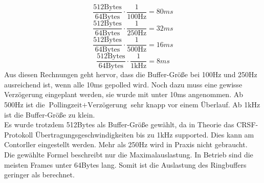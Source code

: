 \[
    \frac{512 \text{Bytes}}{64 \text{Bytes}} \cdot \frac{1}{100 \text{Hz}} = 80ms
\] 
\[
    \frac{512 \text{Bytes}}{64 \text{Bytes}} \cdot \frac{1}{250 \text{Hz}} = 32ms
\] 
\[
    \frac{512 \text{Bytes}}{64 \text{Bytes}} \cdot \frac{1}{500 \text{Hz}} = 16ms
\] 
\[
    \frac{512 \text{Bytes}}{64 \text{Bytes}} \cdot \frac{1}{1 \text{kHz}} = 8ms
\] 
Aus diesen Rechnungen geht hervor, dass die Buffer-Größe bei 100Hz und 250Hz
ausreichend ist, wenn alle 10ms gepolled wird. Noch dazu muss eine gewisse Verzögerung
eingeplant werden, sie wurde mit unter 10ms angenommen. 
Ab 500Hz ist die $\text{Pollingzeit} + \text{Verzögerung}$ sehr knapp vor einem
Überlauf. Ab 1kHz ist die Buffer-Größe zu klein.\\
Es wurde trotzdem 512Bytes als Buffer-Größe gewählt, da in Theorie das
CRSF-Protokoll Übertragungsgeschwindigkeiten bis zu 1kHz supported. Dies kann am
Contorller eingestellt werden. Mehr als 250Hz wird in Praxis nicht gebraucht.\\
Die gewählte Formel beschreibt nur die Maximalauslastung. In Betrieb sind
die meisten Frames unter 64Bytes lang. Somit ist die Auslastung des Ringbuffers
geringer als berechnet.
